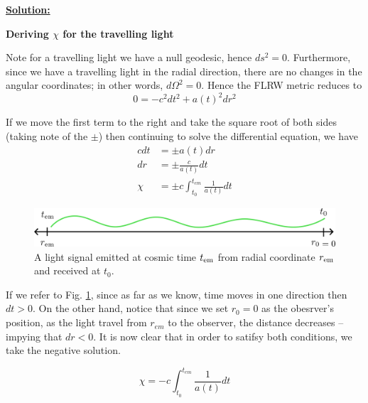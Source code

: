 \documentclass[a4paper,11pt]{article}
\begin{document}
\underline{\textbf{Solution:}}

\vspace{1em}

\textbf{Deriving $\chi$ for the travelling light}

Note for a travelling light we have a null geodesic, hence $ds^2=0$. 
Furthermore, since we have a travelling light in the radial direction,
there are no changes in the angular coordinates; in other words, $d\Omega^2 = 0$. 
Hence the FLRW metric reduces to
\begin{equation}
    0 = -c^2 dt^2 + a(t)^2 dr^2
    \label{null-geodesic-flrw}
\end{equation}

If we move the first term to the right and take the square root of both sides (taking note of the $\pm$)
then continuing to solve the differential equation, we have
\begin{equation}
\begin{aligned}
     cdt &= \pm a(t) dr\\
     dr &= \pm \frac{c}{a(t)} dt\\
     \chi &= \pm c \int_{t_0}^{t_{em}} \frac{1}{a(t)} dt
\end{aligned}
\label{eq:comovingdistance}
\end{equation}


\begin{figure}[H]
\centering
\def\imgwidth{0.65\linewidth}
\includegraphics[width=\imgwidth]{pasted-images/comovinglight.png}
\caption{A light signal emitted at cosmic time $t_{\rm em}$ from radial coordinate $r_{\rm em}$ and received at $t_0$.}
\label{fig:comovinglight}
\end{figure}


If we refer to Fig. \ref{fig:comovinglight}, since as far as we know, time moves in one direction
then $dt>0$. On the other hand, notice that since we set $r_0=0$ as the obesrver's position,
as the light travel from $r_{em}$ to the observer, the distance decreases -- impying that $dr<0$.
It is now clear that in order to satifsy both conditions, we take the negative solution.

\begin{equation}
    \chi = -c \int_{t_0}^{t_{em}} \frac{1}{a(t)} dt
    \label{comoving-distance-integral}
\end{equation}
\end{document}
